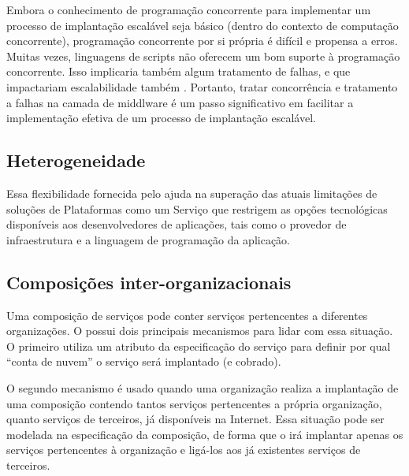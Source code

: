 Embora o conhecimento de programação concorrente para implementar
um processo de implantação escalável seja básico (dentro do contexto de computação concorrente),
programação concorrente por si própria é difícil e propensa a erros.
Muitas vezes, linguagens de scripts não oferecem um bom suporte à programação concorrente.
Isso implicaria também algum tratamento de falhas,
e que impactariam escalabilidade também .
Portanto, tratar concorrência e tratamento a falhas na camada de middlware
é um passo significativo em facilitar a implementação efetiva de um
processo de implantação escalável.

\subsection{Heterogeneidade}
\label{sec:heterogeneidade}


%

Essa flexibilidade fornecida pelo \ee ajuda na superação
das atuais limitações de soluções de Plataformas como um Serviço
que restrigem as opções tecnológicas disponíveis aos desenvolvedores de aplicações,
tais como o provedor de infraestrutura e a linguagem de programação da aplicação.

\subsection{Composições inter-organizacionais}

Uma composição de serviços pode conter serviços pertencentes a diferentes organizações.
O \ee possui dois principais mecanismos para lidar com essa situação.
O primeiro utiliza um atributo da especificação do serviço para definir
por qual ``conta de nuvem'' o serviço será implantado (e cobrado).

O segundo mecanismo é usado quando uma organização realiza a implantação
de uma composição contendo tantos serviços pertencentes a própria organização,
quanto serviços de terceiros, já disponíveis na Internet.
Essa situação pode ser modelada na especificação da composição,
de forma que o \ee irá implantar apenas os serviços pertencentes à organização
e ligá-los aos já existentes serviços de terceiros.

